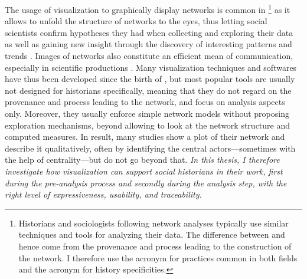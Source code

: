 The usage of visualization to graphically display networks is common in \sna\footnote{Historians and sociologists following network analyses typically use similar techniques and tools for analyzing their data. The difference between \sna and \hsna hence come from the provenance and process leading to the construction of the network. I therefore use the \sna acronym for practices common in both fields and the \hsna acronym for history specificities.} as it allows to unfold the structure of networks to the eyes, thus letting social scientists confirm hypotheses they had when collecting and exploring their data as well as gaining new insight through the discovery of interesting patterns and trends \cite{cristofoliPrincipesUsagesDessins}.
Images of networks also constitute an efficient mean of communication, especially in scientific productions \cite{freemanVisualizingSocialNetworks2000}.
Many visualization techniques and softwares have thus been developed since the birth of \sna, but most popular tools are usually not designed for historians specifically, meaning that they do not regard on the provenance and process leading to the network, and focus on analysis aspects only.
Moreover, they usually enforce simple network models without proposing exploration mechanisms, beyond allowing to look at the network structure and computed measures.
In result, many \hsna studies show a plot of their network and describe it qualitatively, often by identifying the central actors---sometimes with the help of centrality---but do not go beyond that\cite{lemercierQuantitativeMethodsHumanities2019}.
\emph{In this thesis, I therefore investigate how visualization can support social historians in their work, first during the pre-analysis process and secondly during the analysis step, with the right level of expressiveness, usability, and traceability.}







